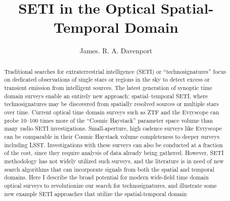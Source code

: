\documentclass[twocolumn]{aastex62}
\begin{document}
\title{SETI in the Optical Spatial-Temporal Domain}



\author{James. R. A. Davenport}


\begin{abstract}
Traditional searches for extraterrestrial intelligence (SETI) or ``technosignatures'' focus on dedicated observations of single stars or regions in the sky to detect excess or transient emission from intelligent sources. The latest generation of synoptic time domain surveys  enable an entirely new approach: spatial--temporal SETI, where technosignatures may be discovered from spatially resolved sources or multiple stars over time. 
Current optical time domain surveys such as ZTF and the Evryscope can probe 10--100 times more of the ``Cosmic Haystack'' parameter space volume than many radio SETI investigations. Small-aperture, high cadence surveys like Evryscope can be comparable in their Cosmic Haystack volume completeness to deeper surveys including LSST. Investigations with these surveys can also be conducted at a fraction of the cost, since they require analysis of data already being gathered. 
However, SETI methodology has not widely utilized such surveys, and the literature is in need of new search algorithms that can incorporate signals from both the spatial and temporal domains.
Here I describe the broad potential for modern wide-field time domain optical surveys to revolutionize our search for technosignatures, and illustrate some new example SETI approaches that utilize the spatial-temporal domain
\end{abstract}

\end{document}
